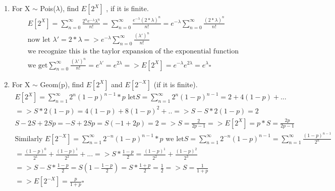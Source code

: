 \documentclass[11pt]{article}
\begin{document}
\begin{enumerate}
\item For X $\sim$ Pois($\lambda$), find $E[2^X]$ , if it is finite.
\begin{gather} 
	E[2^X] =\sum_{n=0}^{\infty} \frac{2^n e^{-\lambda} \lambda ^n}{n!} = \sum_{n=0}^{\infty} \frac{e^{-\lambda} (2*\lambda) ^n}{n!} = e^{-\lambda}  \sum_{n=0}^{\infty} \frac{(2*\lambda) ^n}{n!}\\
	\text{now let } \lambda' = 2*\lambda => e^{-\lambda}  \sum_{n=0}^{\infty} \frac{(\lambda') ^n}{n!}\\
	\text{we recognize this is the taylor expansion of the exponential function}\\
	\text{we get} \sum_{n=0}^{\infty} \frac{(\lambda') ^n}{n!} = e^{\lambda'} = e^{2\lambda}  => E[2^X] = e^{-\lambda} e^{2\lambda}  = e^{\lambda} \square
\end{gather}
\item For X $\sim$ Geom(p), find $E[2^X]$ and $E[2^{-X}]$ (if it is finite).
\begin{gather} 
E[2^X] =\sum_{n=1}^{\infty} 2^n (1-p)^{n-1}*p \text{ let} S = \sum_{n=1}^{\infty} 2^n (1-p)^{n-1} = 2 + 4(1-p) +... \\
=>S*2(1-p) = 4(1-p) + 8(1-p)^2 + .. => S-S*2(1-p) = 2\\
S-2S+2Sp = -S+2Sp = S(-1 + 2p) = 2 => S = \frac{2}{2p-1} =>E[2^X]=p*S = \frac{2p}{2p-1} \\
\text{Similarly  }
E[2^{-X}] = \sum_{n=1}^{\infty} 2^{-n} (1-p)^{n-1}*p \text{ we let} S =\sum_{n=1}^{\infty} 2^{-n} (1-p)^{n-1} = \sum_{n=1}^{\infty} \frac{(1-p)^{n-1}}{2^n}\\
= \frac{(1-p)^{0}}{2^1} + \frac{(1-p)^{1}}{2^2} + ... => S*\frac{1-p}{2} = \frac{(1-p)^{1}}{2^2} + \frac{(1-p)^{2}}{2^3} \\
=> S-S*\frac{1-p}{2} = S(1-\frac{1-p}{2}) = S * \frac{1+p}{2} = \frac{1}{2} => S = \frac{1}{1+p}\\
=> E[2^{-X}] = \frac{p}{1+p} \square
\end{gather}
\end{enumerate}
\end{document}
